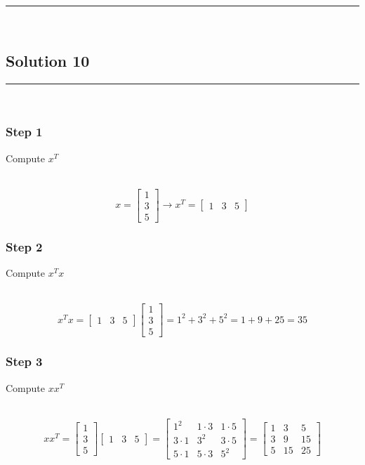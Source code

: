 \documentclass{article}
\begin{document}
\noindent\rule{\textwidth}{0.4pt}\\

\newpage
\subsection*{Solution 10}
\noindent\rule{\textwidth}{0.4pt}\\

\subsubsection*{Step 1}
\parbox{\textwidth}{Compute $x^{T}$}\\
$$x= \begin{bmatrix} 1 \\ 3 \\ 5 \end{bmatrix} \rightarrow x^{T} = \begin{bmatrix} 1 & 3 & 5 \end{bmatrix}$$

\subsubsection*{Step 2}
\parbox{\textwidth}{Compute $x^{T}x$}\\
$$x^{T}x = \begin{bmatrix} 1 & 3 & 5 \end{bmatrix} \begin{bmatrix} 1 \\ 3 \\ 5 \end{bmatrix} = 1^2 + 3^2 + 5^2 = 1 + 9 + 25 = 35$$
\subsubsection*{Step 3}
\parbox{\textwidth}{Compute $xx^{T}$}\\
$$xx^{T} = \begin{bmatrix} 1 \\ 3 \\ 5 \end{bmatrix} \begin{bmatrix} 1 & 3 & 5 \end{bmatrix} = \begin{bmatrix} 1^2 & 1\cdot3 & 1\cdot5 \\ 3\cdot1 & 3^2 & 3\cdot5 \\ 5\cdot1 & 5\cdot3 & 5^2 \end{bmatrix} = \begin{bmatrix} 1 & 3 & 5 \\ 3 & 9 & 15 \\ 5 & 15 & 25 \end{bmatrix}$$
\end{document}

